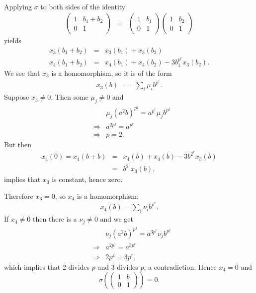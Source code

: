 \begin{example}
\begin{eqnarray*}
	\end{eqnarray*}
	Applying $\sigma$ to both sides of the identity
	\begin{eqnarray*}
		\left(\begin{matrix} 1 & b_1 + b_2 \\ 0 & 1\end{matrix}\right) &=&
		\left(\begin{matrix} 1 & b_1 \\ 0 & 1\end{matrix}\right)
		\left(\begin{matrix} 1 & b_2 \\ 0 & 1\end{matrix}\right)
	\end{eqnarray*}
	yields
	\begin{eqnarray*}
		x_3(b_1 + b_2) &=& x_3(b_1) + x_3(b_2)\\
		x_4(b_1 + b_2) &=& x_4(b_1) + x_4(b_2) - 3b_1^{p^r}x_3(b_2).
	\end{eqnarray*}
	We see that $x_3$ is a homomorphism, so it is of the form
	\begin{eqnarray*}
		x_3(b) &=& \sum_i \mu_i b^{p^i}.
	\end{eqnarray*}
	Suppose $x_3\neq 0$. Then some $\mu_j\neq 0$ and
	\begin{eqnarray*}
		&&\mu_j (a^2b)^{p^j} = a^{p^r}\mu_j b^{p^j}\\
		&\Longrightarrow& a^{2p^j} = a^{p^r}\\
		&\Longrightarrow& p = 2.
	\end{eqnarray*}
	But then
	\begin{eqnarray*}
		x_4(0) = x_4(b+b) &=& x_4(b)+x_4(b)-3b^{2^r}x_3(b)\\
		&=& b^{2^r}x_3(b),
	\end{eqnarray*}
	implies that $x_3$ is constant, hence zero. 
	
	Therefore $x_3 = 0$, so $x_4$ is a homomorphism:
	\begin{eqnarray*}
		x_4(b) = \sum_i \nu_i b^{p^r}.
	\end{eqnarray*}
	If $x_4\neq 0$ then there is a $\nu_j\neq 0$ and we get
	\begin{eqnarray*}
		&&\nu_j(a^2b)^{p^j} = a^{3p^r}\nu_j b^{p^j}\\
		&\Longrightarrow& a^{2p^j} = a^{3p^r}\\
		&\Longrightarrow& 2p^j = 3p^r,
	\end{eqnarray*}
	which implies that 2 divides $p$ and 3 divides $p$, a contradiction. Hence $x_4=0$ and
	\begin{displaymath}
		\sigma\left(\left(\begin{matrix}1 & b\\0 & 1\end{matrix}\right)\right) = 0.
	\end{displaymath}
	\label{eg:g2}
\end{example}

